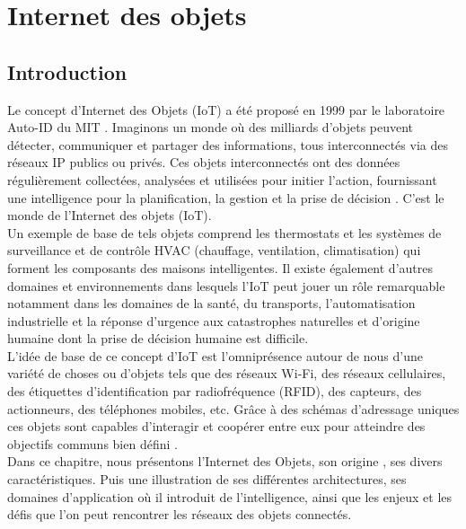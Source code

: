 \chapter{Internet des objets}\label{chap1}
\minitoc
\thispagestyle{empty}
\newpage	
	
	\section{Introduction}
	Le concept  d’Internet des Objets (IoT) a été proposé en 1999 par le laboratoire Auto-ID du MIT \cite{hu2016security}. Imaginons un monde où des milliards d'objets peuvent détecter, communiquer et partager des informations, tous interconnectés via des réseaux IP publics ou privés. Ces objets interconnectés ont des données régulièrement collectées, analysées et utilisées pour initier l'action, fournissant une intelligence pour la planif{\kern0pt}ication, la gestion et la prise de décision \cite{patel2016iot}. C'est le monde de l'Internet des objets (IoT).\\
	Un exemple de base de tels objets comprend les thermostats et les systèmes de surveillance et de contrôle HVAC (chauf{\kern0pt}fage, ventilation, climatisation) qui forment les composants des maisons intelligentes. Il existe également d'autres domaines et environnements dans lesquels l’IoT peut jouer un rôle remarquable notamment dans les domaines de la santé, du transports, l'automatisation industrielle et la réponse d'urgence aux catastrophes naturelles et d'origine humaine dont la prise de décision humaine est dif{\kern0pt}f{\kern0pt}icile.\\
	
	L'idée de base de ce concept d’IoT est l'omniprésence autour de nous d'une variété de choses ou d'objets tels que des réseaux Wi-Fi, des réseaux cellulaires, des étiquettes d'identif{\kern0pt}ication par radiofréquence (RFID), des capteurs, des actionneurs, des téléphones mobiles, etc.  Grâce à des schémas d'adressage uniques ces objets sont capables d'interagir et coopérer entre eux  pour atteindre des objectifs communs bien défini \cite{atzori2010iot}.\\
	
	Dans ce chapitre, nous présentons l’Internet des Objets, son origine , ses divers caractéristiques. Puis une illustration de ses dif{\kern0pt}férentes architectures, ses domaines d’application où il introduit de l’intelligence, ainsi que les enjeux et les déf{\kern0pt}is que l’on peut rencontrer les réseaux des objets connectés.
